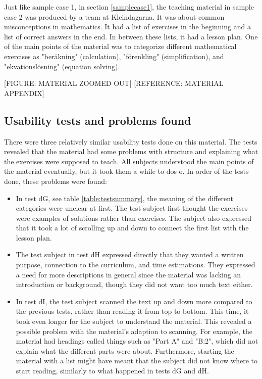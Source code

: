 Just like sample case 1, in section \ref{samplecase1}, the teaching material in sample case 2 was produced by a team at Kleindagarna. It was about common misconceptions in mathematics. It had a list of exercises in the beginning and a list of correct answers in the end. In between these lists, it had a lesson plan. One of the main points of the material was to categorize different mathematical exercises as "beräkning" (calculation), "förenkling" (simplification), and "ekvationslösning" (equation solving).

[FIGURE: MATERIAL ZOOMED OUT]
[REFERENCE: MATERIAL APPENDIX]

\subsection{Usability tests and problems found}

There were three relatively similar usability tests done on this material. The tests revealed that the material had some problems with structure and explaining what the exercises were supposed to teach. All subjects understood the main points of the material eventually, but it took them a while to dos o. In order of the tests done, these problems were found:

\begin{itemize}
  \item In test dG, see table \ref{table:testsummary}, the meaning of the different categories were unclear at first. The test subject first thought the exercises were examples of solutions rather than exercises. The subject also expressed that it took a lot of scrolling up and down to connect the first list with the lesson plan.
  \item The test subject in test dH expressed directly that they wanted a written purpose, connection to the curriculum, and time estimations. They expressed a need for more descriptions in general since the material was lacking an introduction or background, though they did not want too much text either.
  \item In test dI, the test subject scanned the text up and down more compared to the previous tests, rather than reading it from top to bottom. This time, it took even longer for the subject to understand the material. This revealed a possible problem with the material's adaption to scanning. For example, the material had headings called things such as "Part A" and "B:2", which did not explain what the different parts were about. Furthermore, starting the material with a list might have meant that the subject did not know where to start reading, similarly to what happened in tests dG and dH.
\end{itemize}

